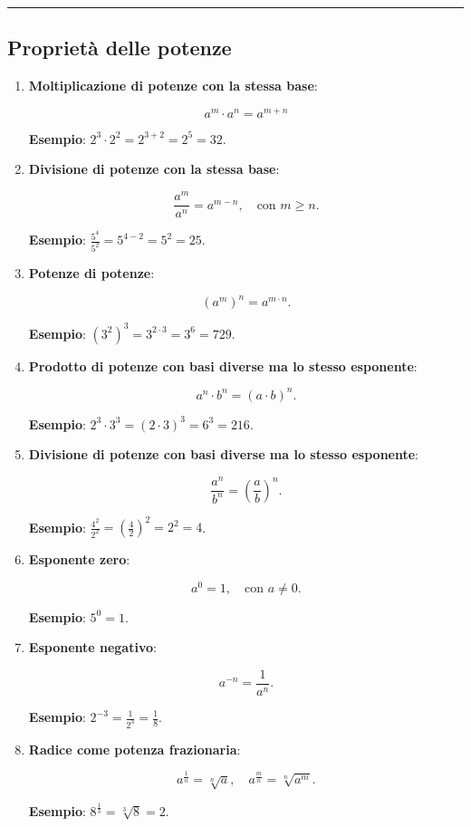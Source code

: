 \documentclass[
  italian,
  letterpaper,
  a4paper,
  11pt,
  open=any]{scrbook}
\theoremstyle{plain}
\theoremstyle{definition}
\theoremstyle{definition}
\theoremstyle{remark}
\begin{document}
\begin{center}\rule{0.5\linewidth}{0.5pt}\end{center}

\subsection{Proprietà delle potenze}\label{proprietuxe0-delle-potenze}

\begin{enumerate}
\def\labelenumi{\arabic{enumi}.}
\item
  \textbf{Moltiplicazione di potenze con la stessa base}:

  \[
  a^m \cdot a^n = a^{m+n}
  \]

  \textbf{Esempio}: \(2^3 \cdot 2^2 = 2^{3+2} = 2^5 = 32\).
\item
  \textbf{Divisione di potenze con la stessa base}:

  \[
  \frac{a^m}{a^n} = a^{m-n}, \quad \text{con } m \geq n.
  \]

  \textbf{Esempio}: \(\frac{5^4}{5^2} = 5^{4-2} = 5^2 = 25\).
\item
  \textbf{Potenze di potenze}:

  \[
  (a^m)^n = a^{m \cdot n}.
  \]

  \textbf{Esempio}: \((3^2)^3 = 3^{2 \cdot 3} = 3^6 = 729\).
\item
  \textbf{Prodotto di potenze con basi diverse ma lo stesso esponente}:

  \[
  a^n \cdot b^n = (a \cdot b)^n.
  \]

  \textbf{Esempio}: \(2^3 \cdot 3^3 = (2 \cdot 3)^3 = 6^3 = 216\).
\item
  \textbf{Divisione di potenze con basi diverse ma lo stesso esponente}:

  \[
  \frac{a^n}{b^n} = \left(\frac{a}{b}\right)^n.
  \]

  \textbf{Esempio}:
  \(\frac{4^2}{2^2} = \left(\frac{4}{2}\right)^2 = 2^2 = 4\).
\item
  \textbf{Esponente zero}:

  \[
  a^0 = 1, \quad \text{con } a \neq 0.
  \]

  \textbf{Esempio}: \(5^0 = 1\).
\item
  \textbf{Esponente negativo}:

  \[
  a^{-n} = \frac{1}{a^n}.
  \]

  \textbf{Esempio}: \(2^{-3} = \frac{1}{2^3} = \frac{1}{8}\).
\item
  \textbf{Radice come potenza frazionaria}:

  \[
  a^{\frac{1}{n}} = \sqrt[n]{a}, \quad a^{\frac{m}{n}} = \sqrt[n]{a^m}.
  \]

  \textbf{Esempio}: \(8^{\frac{1}{3}} = \sqrt[3]{8} = 2\).
\end{enumerate}
\end{document}

